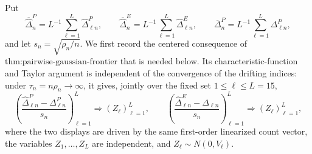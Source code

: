 Put
\[
 \overline{\widehat\Delta}^{P}_{n}
   =L^{-1}\sum_{\ell=1}^{L}\widehat\Delta^{P}_{\ell n},
 \qquad
 \overline{\widehat\Delta}^{E}_{n}
   =L^{-1}\sum_{\ell=1}^{L}\widehat\Delta^{E}_{\ell n},
 \qquad
 \overline\Delta^{P}_{n}
   =L^{-1}\sum_{\ell=1}^{L}\Delta^{P}_{\ell n},
\]
and let \(s_n=\sqrt{\rho_n/n}\).  We first record the centered consequence of
\(\text{thm:pairwise-gaussian-frontier}\) that is needed below.  Its
characteristic-function and Taylor argument is independent of the convergence
of the drifting indices: under \(\tau_n=n\rho_n\to\infty\), it gives, jointly
over the fixed set \(1\leq\ell\leq L=15\),
\[
 \left(
   \frac{\widehat\Delta^{P}_{\ell n}-\Delta^{P}_{\ell n}}{s_n}
 \right)_{\ell=1}^{L}
 \Rightarrow (Z_\ell)_{\ell=1}^{L},
 \qquad
 \left(
   \frac{\widehat\Delta^{E}_{\ell n}-\Delta_{\ell n}}{s_n}
 \right)_{\ell=1}^{L}
 \Rightarrow (Z_\ell)_{\ell=1}^{L},
 \tag{1}
\]
where the two displays are driven by the same first-order linearized count
vector, the variables \(Z_1,\ldots,Z_L\) are independent, and
\(Z_\ell\sim N(0,V_\ell)\).

